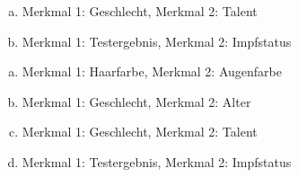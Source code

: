 \begin{exercise}
\begin{enumerate}[a)]
\begin{center}
        \end{center}\medskip
      \item Merkmal 1: Geschlecht, Merkmal 2: Talent
      \item Merkmal 1: Testergebnis, Merkmal 2: Impfstatus
        \begin{center}
          \begin{fourfoldtable}
          \end{fourfoldtable}%
          \hspace{3em}%
          \begin{fourfoldtable}
          \end{fourfoldtable}%
        \end{center}
    \end{enumerate}
  \fi
  \ifoutcome\outcome\par
    \begin{enumerate}[a)]
      \item Merkmal 1: Haarfarbe, Merkmal 2: Augenfarbe
      \item Merkmal 1: Geschlecht, Merkmal 2: Alter
        \begin{center}
          \begin{fourfoldtable}
          \end{fourfoldtable}%
          \hspace{3em}%
          \begin{fourfoldtable}%
          \end{fourfoldtable}%
        \end{center}\medskip
      \item Merkmal 1: Geschlecht, Merkmal 2: Talent
      \item Merkmal 1: Testergebnis, Merkmal 2: Impfstatus
        \begin{center}

\end{center}
\end{enumerate}
\end{exercise}
